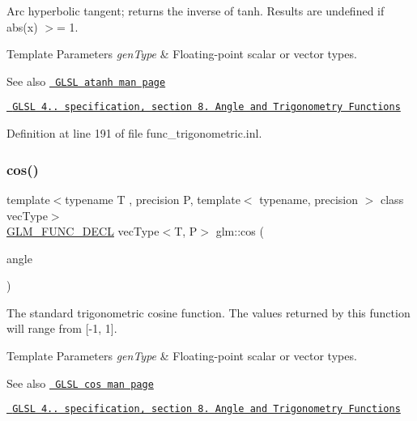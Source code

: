 Arc hyperbolic tangent; returns the inverse of tanh. Results are undefined if abs(x) $>$= 1.


\begin{DoxyTemplParams}{Template Parameters}
{\em gen\+Type} & Floating-\/point scalar or vector types.\\
\hline
\end{DoxyTemplParams}
\begin{DoxySeeAlso}{See also}
\href{http://www.opengl.org/sdk/docs/manglsl/xhtml/atanh.xml}{\texttt{ G\+L\+SL atanh man page}} 

\href{http://www.opengl.org/registry/doc/GLSLangSpec.4.20.8.pdf}{\texttt{ G\+L\+SL 4.. specification, section 8. Angle and Trigonometry Functions}} 
\end{DoxySeeAlso}


Definition at line 191 of file func\+\_\+trigonometric.\+inl.

\mbox{\label{group__core__func__trigonometric_ga728fd86f14609e37d83f82429995b7b3}} 
\subsubsection{\texorpdfstring{cos()}{cos()}}
{\footnotesize\ttfamily template$<$typename T , precision P, template$<$ typename, precision $>$ class vec\+Type$>$ \\
\mbox{\hyperlink{setup_8hpp_ab2d052de21a70539923e9bcbf6e83a51}{G\+L\+M\+\_\+\+F\+U\+N\+C\+\_\+\+D\+E\+CL}} vec\+Type$<$T, P$>$ glm\+::cos (\begin{DoxyParamCaption}\item[{vec\+Type$<$ T, P $>$ const \&}]{angle }\end{DoxyParamCaption})}

The standard trigonometric cosine function. The values returned by this function will range from \mbox{[}-\/1, 1\mbox{]}.


\begin{DoxyTemplParams}{Template Parameters}
{\em gen\+Type} & Floating-\/point scalar or vector types.\\
\hline
\end{DoxyTemplParams}
\begin{DoxySeeAlso}{See also}
\href{http://www.opengl.org/sdk/docs/manglsl/xhtml/cos.xml}{\texttt{ G\+L\+SL cos man page}} 

\href{http://www.opengl.org/registry/doc/GLSLangSpec.4.20.8.pdf}{\texttt{ G\+L\+SL 4.. specification, section 8. Angle and Trigonometry Functions}} 
\end{DoxySeeAlso}


